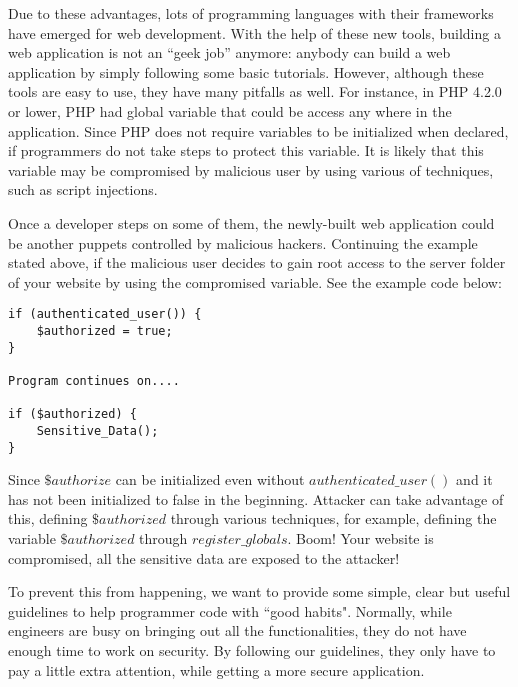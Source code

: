 \documentclass[conference]{IEEEtran}
\begin{document}
Due to these advantages, lots of programming languages with their frameworks have
emerged for web development. With the help of these new tools,
building a web application is not an ``geek job'' anymore:
anybody can build a web application by simply following some basic tutorials.
However, although these tools are easy to use,
they have many pitfalls as well. For instance, in PHP 4.2.0 or lower, PHP had global variable that could be access 
any where in the application. Since PHP does not require variables to be initialized when declared, if programmers
do not take steps to protect this variable. It is likely that this variable may be compromised by malicious user by
using various of techniques, such as script injections.

Once a developer steps on some of them, the newly-built web application could
be another puppets controlled by malicious hackers. Continuing the example stated above, if the malicious user
decides to gain root access to the server folder of your website by using the compromised variable. See the example code below:
\begin{framed}
\begin{verbatim}
if (authenticated_user()) {
    $authorized = true;
}

Program continues on....

if ($authorized) {
    Sensitive_Data();
}
\end{verbatim}
\end{framed}

Since $\$authorize$ can be initialized even without $authenticated\_user()$ and it has not been initialized to false in the beginning. Attacker
can take advantage of this, defining $\$authorized$ through various techniques, for example, defining the variable $\$authorized$ through $register\_globals$. 
Boom! Your website is compromised, all the sensitive data are exposed to the attacker!

To prevent this from happening, we want to provide some simple, clear but
useful guidelines to help programmer code with ``good habits".
Normally, while engineers are busy on bringing out all the functionalities,
they do not have enough time to work on security. By following our guidelines,
they only have to pay a little extra attention, while getting a more secure application.
\end{document}
